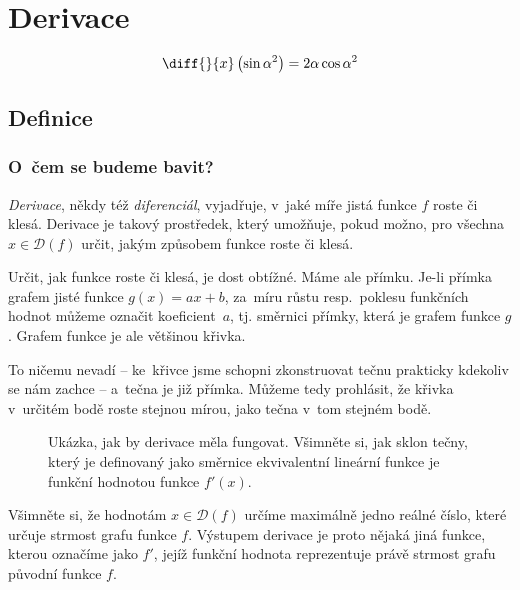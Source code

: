\chapter{Derivace}

\vfill{}
{\Huge\color{gray} \begin{equation*}
    \diff{}{x} \left( \sin \alpha^2 \right) = 2 \alpha \cos \alpha^2
\end{equation*} }

\vfill{}
\pagebreak
\section{Definice}

\subsection{O~čem se budeme bavit?}

\textit{Derivace}, někdy též \textit{diferenciál}, vyjadřuje, v~jaké míře jistá
funkce $f$ roste či klesá. Derivace je takový prostředek, který umožňuje, pokud
možno, pro všechna $x \in \mathcal{D}(f)$ určit, jakým způsobem funkce roste či
klesá.

Určit, jak funkce roste či klesá, je dost obtížné. Máme ale přímku. Je-li přímka
grafem jisté funkce $g(x) = ax + b$, za~míru růstu resp.~poklesu funkčních hodnot
můžeme označit koeficient~$a$, tj. směrnici přímky, která je grafem funkce $g$.
Grafem funkce je ale většinou křivka.

To ničemu nevadí -- ke~křivce jsme schopni zkonstruovat tečnu prakticky kdekoliv se
nám zachce -- a~tečna je již přímka. Můžeme tedy prohlásit, že křivka v~určitém bodě
roste stejnou mírou, jako tečna v~tom stejném bodě.

\begin{figure}[hb!]
    \centering
    
    \caption[
        Ukázka, jak by derivace měla fungovat
    ]{
        Ukázka, jak by derivace měla fungovat. Všimněte si, jak sklon tečny, který
        je definovaný jako směrnice ekvivalentní lineární funkce je funkční hodnotou
        funkce $f'(x)$.
    }
\end{figure}

Všimněte si, že hodnotám $x \in \mathcal{D}(f)$ určíme maximálně jedno reálné číslo,
které určuje strmost grafu funkce $f$. Výstupem derivace je proto nějaká jiná funkce,
kterou označíme jako $f'$, jejíž funkční hodnota reprezentuje právě strmost grafu
původní funkce $f$.

